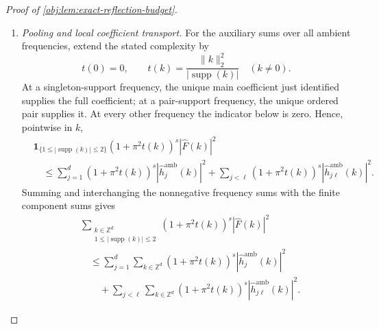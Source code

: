 \begin{proof}[Proof of \cref{obj:lem:exact-reflection-budget}]
\begin{enumerate}
\item \textit{Pooling and local coefficient transport.}
For the auxiliary sums over all ambient frequencies, extend the stated complexity by
\[
t(0)=0,
\qquad
t(k)=\frac{\|k\|_2^2}{|\operatorname{supp}(k)|}
\quad(k\neq0).
\]
At a singleton-support frequency, the unique main coefficient just identified supplies the full coefficient; at a pair-support frequency, the unique ordered pair supplies it. At every other frequency the indicator below is zero. Hence, pointwise in \(k\),
\[
\begin{aligned}
&\mathbf1_{\{1\leq|\operatorname{supp}(k)|\leq2\}}
(1+\pi^2t(k))^s|\widehat F(k)|^2\\
&\quad\leq
\sum_{j=1}^d
(1+\pi^2t(k))^s|\widehat h_j^{\mathrm{amb}}(k)|^2
+
\sum_{j<\ell}
(1+\pi^2t(k))^s|\widehat h_{j\ell}^{\mathrm{amb}}(k)|^2.
\end{aligned}
\]
Summing and interchanging the nonnegative frequency sums with the finite component sums gives
\[
\begin{aligned}
&\sum_{\substack{k\in\mathbb Z^d\\1\leq|\operatorname{supp}(k)|\leq2}}
(1+\pi^2t(k))^s|\widehat F(k)|^2\\
&\quad\leq
\sum_{j=1}^d\sum_{k\in\mathbb Z^d}
(1+\pi^2t(k))^s|\widehat h_j^{\mathrm{amb}}(k)|^2\\
&\qquad+
\sum_{j<\ell}\sum_{k\in\mathbb Z^d}
(1+\pi^2t(k))^s|\widehat h_{j\ell}^{\mathrm{amb}}(k)|^2.
\end{aligned}
\]


\end{enumerate}
\end{proof}
